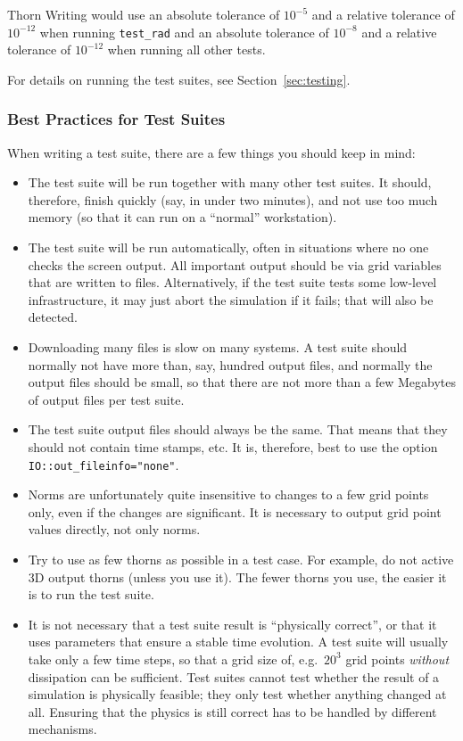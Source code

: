 \begin{cactuspart}{Thorn Writing}
would use an absolute tolerance of $10^{-5}$ and a relative tolerance of
$10^{-12}$ when running \verb|test_rad| and an absolute tolerance of $10^{-8}$
and a relative tolerance of $10^{-12}$ when running all other tests.

For details on running the test suites, see Section~\ref{sec:testing}.

\subsubsection{Best Practices for Test Suites}

When writing a test suite, there are a few things you should keep in
mind:

\begin{itemize}
\item The test suite will be run together with many other test
  suites.  It should, therefore, finish quickly (say, in under two
  minutes), and not use too much memory (so that it can run on a
  ``normal'' workstation).
\item The test suite will be run automatically, often in situations
  where no one checks the screen output.  All important output should
  be via grid variables that are written to files.  Alternatively, if
  the test suite tests some low-level infrastructure, it may just
  abort the simulation if it fails; that will also be detected.
\item Downloading many files is slow on many systems.  A test suite
  should normally not have more than, say, hundred output files, and
  normally the output files should be small, so that there are not
  more than a few Megabytes of output files per test suite.
\item The test suite output files should always be the same.  That
  means that they should not contain time stamps, etc.  It is,
  therefore, best to use the option \verb|IO::out_fileinfo="none"|.
\item Norms are unfortunately quite insensitive to changes to a few
  grid points only, even if the changes are significant.  It is
  necessary to output grid point values directly, not only norms.
\item Try to use as few thorns as possible in a test case.  For example, do
  not active 3D output thorns (unless you use it).  The fewer thorns
  you use, the easier it is to run the test suite.
\item It is not necessary that a test suite result is ``physically
  correct'', or that it uses parameters that ensure a stable time
  evolution.  A test suite will usually take only a few time steps, so
  that a grid size of, e.g.\ $20^3$ grid points \emph{without}
  dissipation can be sufficient.  Test suites cannot test whether the
  result of a simulation is physically feasible; they only test
  whether anything changed at all.  Ensuring that the physics is still
  correct has to be handled by different mechanisms.
\end{itemize}


\end{cactuspart}

